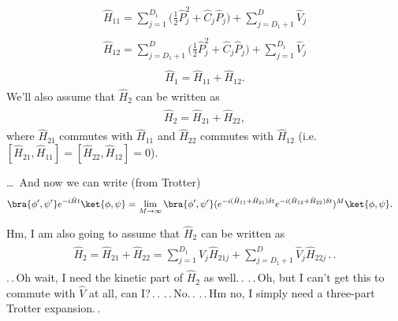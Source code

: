 \documentclass{report}
\begin{document}
\begin{align}
\begin{aligned}
	\hat H_{11} = 
		\sum_{j=1}^{D_1} \big(
			\frac{1}{2} \hat P_{j}^2 + 
			\hat C_{j} \hat P_{j}
		\big) + 
		\sum_{j=D_1+1}^{D}
			\hat V_{j} 
	\label{H_11_01}
\end{aligned}
\end{align} 
\begin{align}
\begin{aligned}
	\hat H_{12} = 
		\sum_{j=D_1+1}^{D} \big(
			\frac{1}{2} \hat P_{j}^2 + 
			\hat C_{j} \hat P_{j}
		\big) + 
		\sum_{j=1}^{D_1}
			\hat V_{j} 
	\label{H_12_01}
\end{aligned}
\end{align} 
\begin{align}
\begin{aligned}
	\hat H_{1} = \hat H_{11} + \hat H_{12}.
	\label{H_1_02}
\end{aligned}
\end{align} 
We'll also assume that $\hat H_{2}$ can be written as
\begin{align}
\begin{aligned}
	\hat H_{2} = \hat H_{21} + \hat H_{22},
\end{aligned}
\end{align}
where $\hat H_{21}$ commutes with $\hat H_{11}$ and $\hat H_{22}$ commutes with $\hat H_{12}$ (i.e.\ $[\hat H_{21}, \hat H_{11}] = [\hat H_{22}, \hat H_{12}] = 0$).

\ldots\ And now we can write (from Trotter)
\begin{align}
\begin{aligned}
	\bra{\phi', \psi'}
		e^{-i \hat H t}
	\ket{\phi, \psi} =&\,
	\lim_{M \to \infty} 
	\bra{\phi', \psi'}
		(e^{-i  (\hat H_{11} + \hat H_{21}) \delta t} e^{-i (\hat H_{12} + \hat H_{22}) \delta t})^M
	\ket{\phi, \psi}. %
\end{aligned}
\end{align} 

Hm, I am also going to assume that $\hat H_2$ can be written as
\begin{align}
\begin{aligned}
	\hat H_{2} = \hat H_{21} + \hat H_{22} =
		\sum_{j=1}^{D_1} \hat V_{j} \hat H_{21j} +
		\sum_{j=D_1+1}^{D} \hat V_{j} \hat H_{22j} \,.\,.
\end{aligned}
\end{align}
.\,.\,Oh wait, I need the kinetic part of $\hat H_2$ as well.\,. .\,.\,Oh, but I can't get this to commute with $\hat V$ at all, can I?\,.\,. .\,.\,No.\,. .\,.\,Hm no, I simply need a three-part Trotter expansion.\,. 
\end{document}
